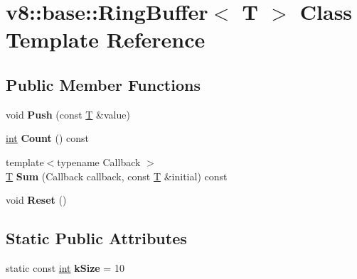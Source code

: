 \hypertarget{classv8_1_1base_1_1RingBuffer}{}\section{v8\+:\+:base\+:\+:Ring\+Buffer$<$ T $>$ Class Template Reference}
\label{classv8_1_1base_1_1RingBuffer}
\subsection*{Public Member Functions}
\begin{DoxyCompactItemize}
\item 
\mbox{\label{classv8_1_1base_1_1RingBuffer_affbe8447ad0b75e1c515750f92c4f035}} 
void {\bfseries Push} (const \mbox{\hyperlink{classv8_1_1internal_1_1torque_1_1T}{T}} \&value)
\item 
\mbox{\label{classv8_1_1base_1_1RingBuffer_a8a7da253f7954debdb6ebaafd54f6349}} 
\mbox{\hyperlink{classint}{int}} {\bfseries Count} () const
\item 
\mbox{\label{classv8_1_1base_1_1RingBuffer_a203c3299b4be190efe2b4a4732351ea5}} 
{\footnotesize template$<$typename Callback $>$ }\\\mbox{\hyperlink{classv8_1_1internal_1_1torque_1_1T}{T}} {\bfseries Sum} (Callback callback, const \mbox{\hyperlink{classv8_1_1internal_1_1torque_1_1T}{T}} \&initial) const
\item 
\mbox{\label{classv8_1_1base_1_1RingBuffer_a081dcf08dd65edd5fc2d071455e25f04}} 
void {\bfseries Reset} ()
\end{DoxyCompactItemize}
\subsection*{Static Public Attributes}
\begin{DoxyCompactItemize}
\item 
\mbox{\label{classv8_1_1base_1_1RingBuffer_a2c1936a4090b28ef1807ba63307a6eda}} 
static const \mbox{\hyperlink{classint}{int}} {\bfseries k\+Size} = 10
\end{DoxyCompactItemize}


